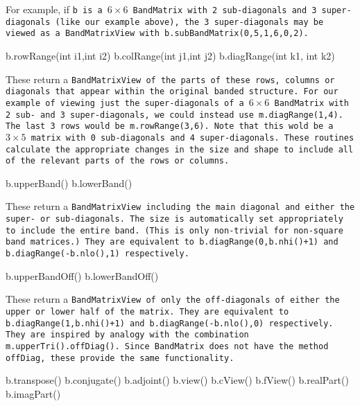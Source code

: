 For example, if \tt{b} is a $6 \times 6$ \tt{BandMatrix} with 2 sub-diagonals and 
3 super-diagonals
(like our example above), the 3 super-diagonals may be viewed as a \tt{BandMatrixView}
with \tt{b.subBandMatrix(0,5,1,6,0,2)}.

\begin{tmvcode}
b.rowRange(int i1,int i2)
b.colRange(int j1,int j2)
b.diagRange(int k1, int k2)
\end{tmvcode}
These return a \tt{BandMatrixView} of the parts of these rows,
columns or diagonals that
appear within the original banded structure.  For our example of viewing just
the super-diagonals of a $6 \times 6$ \tt{BandMatrix} with 2 sub- and 
3 super-diagonals, we
could instead use \tt{m.diagRange(1,4)}.  The last 3 rows would be \tt{m.rowRange(3,6)}.
Note that this wold be a $3 \times 5$ matrix with 0 sub-diagonals and 
4 super-diagonals.
These routines calculate the appropriate changes in the size and shape to include
all of the relevant parts of the rows or columns.

\begin{tmvcode}
b.upperBand()
b.lowerBand()
\end{tmvcode}
These return a \tt{BandMatrixView} including the main diagonal and either the
super- or sub-diagonals.  The size
is automatically set appropriately to include the entire band.  (This is only
non-trivial for non-square band matrices.)  They are equivalent to
\tt{b.diagRange(0,b.nhi()+1)} and \tt{b.diagRange(-b.nlo(),1)} respectively.

\begin{tmvcode}
b.upperBandOff()
b.lowerBandOff()
\end{tmvcode}
These return a \tt{BandMatrixView} of only the off-diagonals of either the
upper or lower half of the matrix.  They are equivalent to
\tt{b.diagRange(1,b.nhi()+1)} and \tt{b.diagRange(-b.nlo(),0)} respectively.  
They are inspired by analogy with the combination \tt{m.upperTri().offDiag()}.
Since \tt{BandMatrix} does not have the method \tt{offDiag}, these provide
the same functionality.

\begin{tmvcode}
b.transpose()
b.conjugate()
b.adjoint()
b.view()
b.cView()
b.fView()
b.realPart()
b.imagPart()
\end{tmvcode}
\vspace{12pt}

